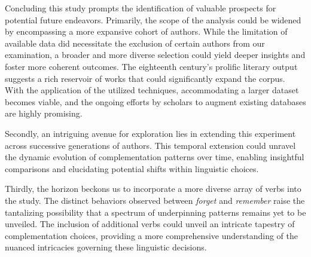 \documentclass[final]{clv3} %
\begin{document}
Concluding this study prompts the identification of valuable prospects for potential future endeavors. Primarily, the scope of the analysis could be widened by encompassing a more expansive cohort of authors. While the limitation of available data did necessitate the exclusion of certain authors from our examination, a broader and more diverse selection could yield deeper insights and foster more coherent outcomes. The eighteenth century's prolific literary output suggests a rich reservoir of works that could significantly expand the corpus. With the application of the utilized techniques, accommodating a larger dataset becomes viable, and the ongoing efforts by scholars to augment existing databases are highly promising.

Secondly, an intriguing avenue for exploration lies in extending this experiment across successive generations of authors. This temporal extension could unravel the dynamic evolution of complementation patterns over time, enabling insightful comparisons and elucidating potential shifts within linguistic choices.

Thirdly, the horizon beckons us to incorporate a more diverse array of verbs into the study. The distinct behaviors observed between \textit{forget} and \textit{remember} raise the tantalizing possibility that a spectrum of underpinning patterns remains yet to be unveiled. The inclusion of additional verbs could unveil an intricate tapestry of complementation choices, providing a more comprehensive understanding of the nuanced intricacies governing these linguistic decisions.

\bigskip
\starttwocolumn

\end{document}
